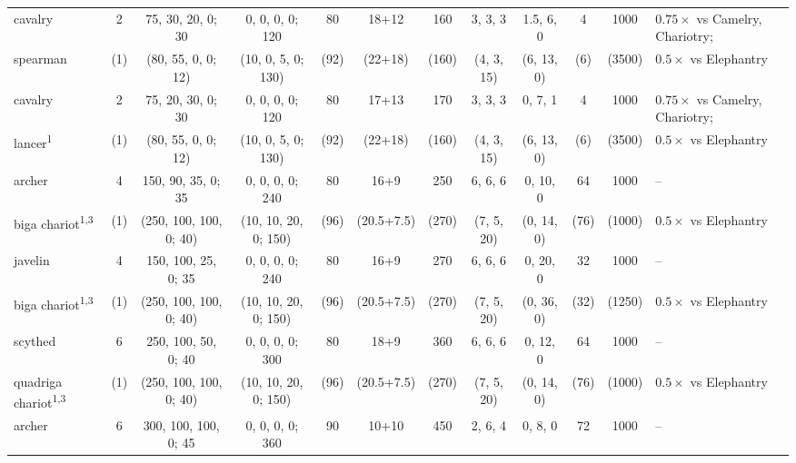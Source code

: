 \documentclass{article}
\begin{document}
\begin{landscape}
\begin{tabular}{l|ccc|cccc|ccc|l}
\hline
cavalry                               &  2  &   75,  30,  20, 0; 30  &  0,  0,  0,  0; 120  &   80  &    18+12    &  160  &   3,  3,  3  &  1.5, 6,  0  &   4  &  1000  & $0.75\times$ vs Camelry, Chariotry;\\
spearman                              & (1) &  (80,  55,   0, 0; 12) & (10,  0,  5, 0; 130) &  (92) &   (22+18)   & (160) &  (4,  3, 15) &  (6, 13,  0) &  (6) & (3500) & $0.5\times$ vs Elephantry\\
\hline
cavalry                               &  2  &   75,  20,  30, 0; 30  &  0,  0,  0,  0; 120  &   80  &    17+13    &  170  &   3,  3,  3  &  0,   7,  1  &   4  &  1000  & $0.75\times$ vs Camelry, Chariotry;\\
lancer\textsuperscript{1}             & (1) &  (80,  55,   0, 0; 12) & (10,  0,  5, 0; 130) &  (92) &   (22+18)   & (160) &  (4,  3, 15) &  (6, 13,  0) &  (6) & (3500) & $0.5\times$ vs Elephantry\\
\hline
archer                                &  4  &  150,  90,  35, 0; 35  &  0,  0,  0,  0; 240  &   80  &    16+9     &  250  &   6,  6,  6  &   0, 10,  0  &  64  &  1000  & -- \\%
biga chariot\textsuperscript{1,3}     & (1) & (250, 100, 100, 0; 40) & (10, 10, 20, 0; 150) &  (96) & (20.5+7.5)  & (270) &  (7,  5, 20) &  (0, 14,  0) & (76) & (1000) & $0.5\times$ vs Elephantry\\
\hline
javelin                               &  4  &  150, 100,  25, 0; 35  &  0,  0,  0,  0; 240  &   80  &    16+9     &  270  &   6,  6,  6  &   0, 20,  0  &  32  &  1000  & -- \\%
biga chariot\textsuperscript{1,3}     & (1) & (250, 100, 100, 0; 40) & (10, 10, 20, 0; 150) &  (96) & (20.5+7.5)  & (270) &  (7,  5, 20) &  (0, 36,  0) & (32) & (1250) & $0.5\times$ vs Elephantry\\
\hline
scythed                               &  6  &  250, 100,  50, 0; 40  &  0,  0,  0,  0; 300  &   80  &    18+9     &  360  &   6,  6,  6  &   0, 12,  0  &  64  &  1000  & -- \\%
quadriga chariot\textsuperscript{1,3} & (1) & (250, 100, 100, 0; 40) & (10, 10, 20, 0; 150) &  (96) & (20.5+7.5)  & (270) &  (7,  5, 20) &  (0, 14,  0) & (76) & (1000) & $0.5\times$ vs Elephantry\\
\hline
archer                                &  6  &  300, 100, 100, 0; 45  &  0,  0,  0,  0; 360  &   90  &    10+10    &  450  &   2,  6,  4  &   0,  8,  0  &  72  &  1000  & -- \\

\end{tabular}
\end{landscape}
\end{document}
